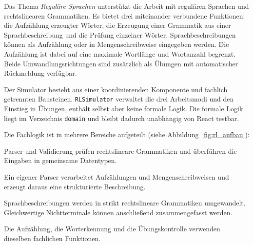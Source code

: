  \label{4_3_RL}

Das Thema \emph{Reguläre Sprachen} unterstützt die Arbeit mit regulären Sprachen und
rechtslinearen Grammatiken.
Es bietet drei miteinander verbundene Funktionen: die Aufzählung erzeugter Wörter,
die Erzeugung einer Grammatik aus einer Sprachbeschreibung und die Prüfung einzelner
Wörter.
Sprachbeschreibungen können als Aufzählung oder in Mengenschreibweise eingegeben
werden.
Die Aufzählung ist dabei auf eine maximale Wortlänge und Wortanzahl begrenzt.
Beide Umwandlungsrichtungen sind zusätzlich als Übungen mit automatischer Rückmeldung
verfügbar.


Der Simulator besteht aus einer koordinierenden Komponente und fachlich getrennten
Bausteinen.
\texttt{RLSimulator} verwaltet die drei Arbeitsmodi und den Einstieg in Übungen,
enthält selbst aber keine formale Logik.
Die formale Logik liegt im Verzeichnis \texttt{domain} und bleibt dadurch unabhängig von React
testbar.

Die Fachlogik ist in mehrere Bereiche aufgeteilt
(siehe Abbildung~\ref{fig:rl_aufbau}):

\begin{description}[leftmargin=*,style=nextline,itemsep=0.75ex]
\item[Grammatikverarbeitung]
Parser und Validierung prüfen rechtslineare Grammatiken und überführen die Eingaben in gemeinsame Datentypen.

\item[Sprachbeschreibung]
Ein eigener Parser verarbeitet Aufzählungen und Mengenschreibweisen und erzeugt
daraus eine strukturierte Beschreibung.

\item[Umwandlung und Vereinfachung]
Sprachbeschreibungen werden in strikt rechtslineare Grammatiken umgewandelt.
Gleichwertige Nichtterminale können anschließend zusammengefasst werden.

\item[Sprachauswertung]
Die Aufzählung, die Worterkennung und die Übungskontrolle verwenden dieselben fachlichen Funktionen.
\end{description}

